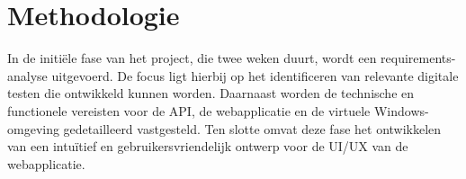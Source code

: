 \section{Methodologie}%
\label{sec:methodologie}







In de initiële fase van het project, die twee weken duurt, wordt een requirements-analyse uitgevoerd. De focus ligt hierbij op het identificeren van relevante digitale testen die ontwikkeld kunnen worden.
Daarnaast worden de technische en functionele vereisten voor de API, de webapplicatie en de virtuele Windows-omgeving gedetailleerd vastgesteld. Ten slotte omvat deze fase het ontwikkelen van een intuïtief en gebruikersvriendelijk ontwerp voor de UI/UX van de webapplicatie.

